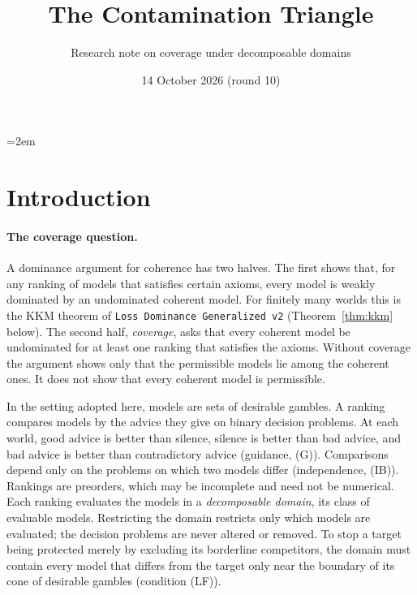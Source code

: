 \documentclass[11pt]{article}
\title{The Contamination Triangle}
\author{Research note on coverage under decomposable domains}
\date{14 October 2026 (round 10)}
\theoremstyle{definition}
\theoremstyle{remark}
\newcommand{\src}[1]{\texttt{#1}}
\begin{document}
\emergencystretch=2em
\maketitle

\section{Introduction}\label{sec:intro}

\paragraph{The coverage question.}
A dominance argument for coherence has two halves. The first shows that, for any ranking of models that satisfies certain axioms, every model is weakly dominated by an undominated coherent model. For finitely many worlds this is the KKM theorem of \src{Loss Dominance Generalized v2} (Theorem~\ref{thm:kkm} below). The second half, \emph{coverage}, asks that every coherent model be undominated for at least one ranking that satisfies the axioms. Without coverage the argument shows only that the permissible models lie among the coherent ones. It does not show that every coherent model is permissible.

In the setting adopted here, models are sets of desirable gambles. A ranking compares models by the advice they give on binary decision problems. At each world, good advice is better than silence, silence is better than bad advice, and bad advice is better than contradictory advice (guidance, (G)). Comparisons depend only on the problems on which two models differ (independence, (IB)). Rankings are preorders, which may be incomplete and need not be numerical. Each ranking evaluates the models in a \emph{decomposable domain}, its class of evaluable models. Restricting the domain restricts only which models are evaluated; the decision problems are never altered or removed. To stop a target being protected merely by excluding its borderline competitors, the domain must contain every model that differs from the target only near the boundary of its cone of desirable gambles (condition (LF)).
\end{document}
